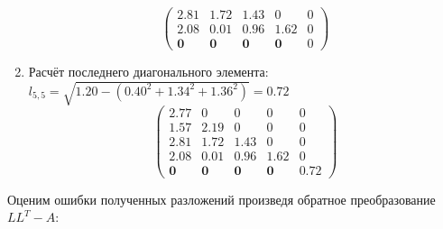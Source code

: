 \begin{multicols}{3}
\begin{enumerate}
$$\begin{pmatrix}
        2.81 & 1.72  & 1.43 & 0          & 0 \\
        2.08 & 0.01  & 0.96 & 1.62       & 0 \\
         \mathbf{0}    &  \mathbf{0}     &  \mathbf{0}    & \mathbf{0} & 0
    \end{pmatrix}$$
    \vspace{-0.5cm}
    \item Расчёт последнего диагонального элемента: $l_{5,5} = \sqrt{1.20 - (0.40^2+1.34^2+1.36^2)} = 0.72$
    $$\begin{pmatrix}
        2.77 & 0    & 0    & 0    & 0    \\
        1.57 & 2.19 & 0    & 0    & 0    \\
        2.81 & 1.72 & 1.43 & 0    & 0    \\
        2.08 & 0.01 & 0.96 & 1.62 & 0    \\
         \mathbf{0}    &  \mathbf{0}    &  \mathbf{0}    &  \mathbf{0}    & 0.72
    \end{pmatrix}$$
    \end{enumerate}
\end{multicols}
Оценим ошибки полученных разложений произведя обратное преобразование $LL^T - A$:

